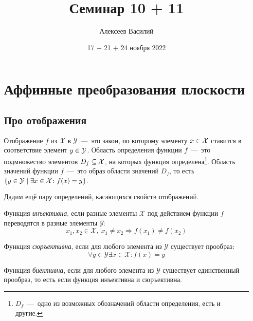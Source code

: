 \documentclass[a4paper,12pt]{article}
\author{Алексеев Василий}
\title{Семинар 10 + 11}
\date{17 + 21 + 24 ноября 2022}
\begin{document}
  \maketitle
  
  \tableofcontents

  \thispagestyle{empty}
  
  \newpage
  


  \section{Аффинные преобразования плоскости}
  
  \subsection{Про отображения}
  
  Отображение $f$ из $\mathcal X$ в $\mathcal Y$~---~это закон, по которому элементу $x \hm\in \mathcal X$ ставится в соответствие элемент $y \hm\in \mathcal Y$.
  Область определения функции $f$~---~это подмножество элементов $D_f \hm\subseteq \mathcal X$, на которых функция определена\footnote{$D_f$~---~одно из возможных обозначений области определения, есть и другие.}.
  Область значений функции $f$~---~это образ области значений $D_f$, то есть $\{y \hm\in \mathcal Y \hm\mid \exists x \hm\in \mathcal X\colon f(x) \hm= y\}$.
  
  Дадим ещё пару определений, касающихся свойств отображений.
  
  \begin{definition}[Инъекция]
    Функция \emph{инъективна}, если разные элементы $\mathcal X$ под действием функции $f$ переводятся в разные элементы $\mathcal Y$:
    \[
      x_1, x_2 \in \mathcal X,\ x_1 \not= x_2 \Rightarrow f(x_1) \not= f(x_2)
    \]
  \end{definition}
  
  \begin{definition}[Сюръекция]
    Функция \emph{сюръективна}, если для любого элемента из $\mathcal Y$ существует прообраз:
    \[
      \forall y \in \mathcal Y \exists x \in \mathcal X\colon f(x) = y
    \]
  \end{definition}
  
  \begin{definition}[Биекция]
    Функция \emph{биективна}, если для любого элемента из $\mathcal Y$ существует единственный прообраз, то есть если функция инъективна и сюръективна.
  \end{definition}
  
\end{document}
